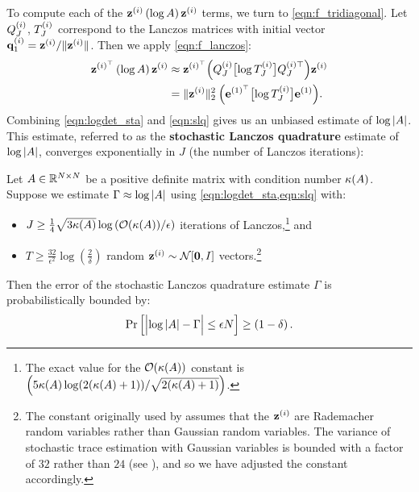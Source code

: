 To compute each of the $\mathbf{z}^{(i)} \left( \log A \right) \mathbf{z}^{(i)}$ terms, we turn to \cref{eqn:f_tridiagonal}.
Let $Q_J^{(i)}$, $T_J^{(i)}$ correspond to the Lanczos matrices with initial vector $\mathbf{q}^{(i)}_1 = \mathbf{z}^{(i)} / \Vert \mathbf{z}^{(i)} \Vert$.
Then we apply \cref{eqn:f_lanczos}:
%
\begin{align}
  \mathbf{z}^{(i)^\top} \left( \log A \right) \mathbf{z}^{(i)}
  &\approx \mathbf{z}^{(i)^\top} \Bigl( Q^{(i)}_J \bigl[ \log T^{(i)}_J \bigr] Q^{(i)\top}_J \Bigr) \mathbf{z}^{(i)}
  \nonumber
  \\
  &= \Vert \mathbf{z}^{(i)} \Vert^2_2 \: \Bigl( \mathbf{e}^{(1)^\top} \bigl[ \log T^{(i)}_J \bigr] \mathbf{e}^{(1)} \Bigr).
  \label{eqn:slq}
\end{align}
%
Combining \cref{eqn:logdet_sta} and \cref{eqn:slq} gives us an unbiased estimate of $\log \vert A \vert$.
This estimate, referred to as the {\bf stochastic Lanczos quadrature} estimate of $\log \vert A \vert$, converges exponentially in $J$ (the number of Lanczos iterations):
%
\begin{theorem}
  \label{thm:slq_convergence}
  Let $A \in \mathbb{R}^{N \times N}$ be a positive definite matrix with condition number $\kappa( A )$.
	Suppose we estimate $\Gamma \approx \log \vert A \vert$ using \cref{eqn:logdet_sta,eqn:slq} with:
	\begin{itemize}
		\item $J \geq \frac{1}{4} \sqrt{ 3 \kappa(\bA) } \log \left( \bigo{\kappa(\bA)} / \epsilon \right)$ iterations of Lanczos,\footnote{
			The exact value for the $\bigo{\kappa(\bA)}$ constant is $\left( 5 \kappa(A) \log ( 2 (\kappa(A) + 1)) / \sqrt{ 2(\kappa(A) + 1) } \right)$.
		} and
		\item $T \geq \frac{32}{\epsilon^2} \log \left( \frac 2 \delta \right)$ random $\bz^{(i)} \sim \normaldist{\bzero}{\bI}$ vectors.\footnote{
			The constant originally used by \citet{ubaru2017fast} assumes that the $\mathbf{z}^{(i)}$ are Rademacher random variables rather than Gaussian random variables.
			The variance of stochastic trace estimation with Gaussian variables is bounded with a factor of $32$ rather than $24$ (see \citep[][Eqs. 4 and 5]{roosta2015improved}), and so we have adjusted the constant accordingly.
		}
	\end{itemize}
  Then the error of the stochastic Lanczos quadrature estimate $\Gamma$ is probabilistically bounded by:
  \begin{equation*}
    \textrm{Pr}\left[\Bigl\vert \log \vert A \vert - \Gamma \Bigr\vert \leq \epsilon N \right] \geq \left( 1 - \delta \right).
  \end{equation*}
\end{theorem}

